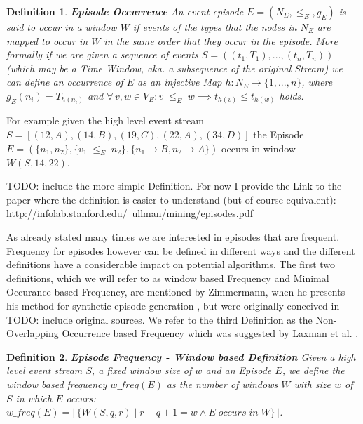 \documentclass[journal]{IEEEtran}
\newtheorem{mydef}{Definition}
\begin{document}
\begin{mydef}
\textbf{Episode Occurrence} An event episode $E = (N_E,{\leq}_{E},g_E)$ is said to occur in a window $W$ if events of the types that the nodes in $N_E$ are mapped to occur in $W$ in the same order that they occur in the episode. More formally if we are given a sequence of events $S=((t_1,T_1),...,(t_n,T_n))$ (which may be a Time Window, aka. a subsequence of the original Stream) we can define an occurrence of $E$ as an injective Map $h:N_E \rightarrow \{1,...,n\}$, where $g_E(n_i) = T_{h(n_i)}$ and $\forall \, v,w \in V_E : v \;{\leq}_{E}\; w \implies t_{h(v)} \leq t_{h(w)}$ holds.
\end{mydef}

For example given the high level event stream $S = [ (12,A) , (14,B) , (19,C) , (22,A), (34,D) ]$ the Episode $E = (\{n_1,n_2\},\{v_1\; {\leq}_{E} \;n_2\},\{n_1 \rightarrow B,n_2\rightarrow A\}  )$ occurs in window $W(S,14,22)$. \newline \newline

TODO: include the more simple Definition. For now I provide the Link to the paper where the definition is easier to understand (but of course equivalent): http://infolab.stanford.edu/~ullman/mining/episodes.pdf \newline \newline

As already stated many times we are interested in episodes that are frequent. Frequency for episodes however can be defined in different ways and the different definitions have a considerable impact on potential algorithms. The first two definitions, which we will refer to as window based Frequency and Minimal Occurance based Frequency, are mentioned by Zimmermann, when he presents his method for synthetic episode generation \cite{generatingEpisodeDatasets}, but were originally conceived in TODO: include original sources. We refer to the third Definition as the Non-Overlapping Occurrence based Frequency which was suggested by Laxman et al. \cite{fastEpisodeMining}.
\begin{mydef}
\textbf{Episode Frequency - Window based Definition} Given a high level event stream $S$, a fixed window size of $w$ and an Episode $E$, we define the window based frequency $w\_freq(E)$ as the number of windows $W$ with size $w$ of $S$ in which $E$ occurs: $w\_freq(E) = |\,\{W(S,q,r) \mid r-q+1 = w \land E \;occurs\; in\; W \}\,|$.
\end{mydef}
\end{document}
